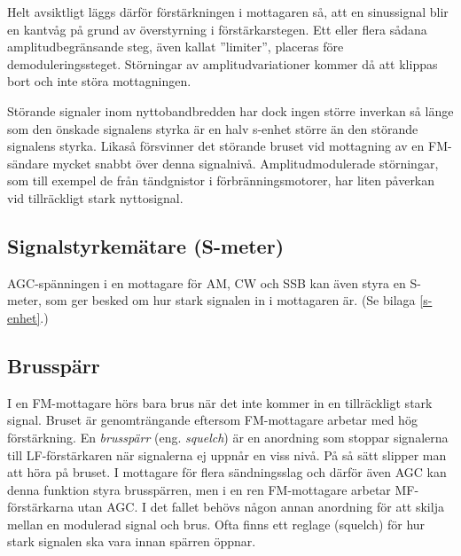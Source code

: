 
Helt avsiktligt läggs därför förstärkningen i mottagaren så, att en
sinussignal blir en kantvåg på grund av överstyrning i förstärkarstegen.
Ett eller flera sådana amplitudbegränsande steg, även kallat ''limiter'',
placeras före demoduleringssteget.
Störningar av amplitudvariationer kommer då att klippas bort och inte störa
mottagningen.

Störande signaler inom nyttobandbredden har dock ingen större inverkan
så länge som den önskade signalens styrka är en halv s-enhet större än
den störande signalens styrka.
Likaså försvinner det störande bruset vid mottagning av en FM-sändare mycket
snabbt över denna signalnivå.
Amplitudmodulerade störningar, som till exempel de från tändgnistor i
förbränningsmotorer, har liten påverkan vid tillräckligt stark nyttosignal.

\subsection{Signalstyrkemätare (S-meter)}

AGC-spänningen i en mottagare för AM, CW och SSB kan även styra en
S-meter, som ger besked om hur stark signalen in i mottagaren är.
(Se bilaga \ref{s-enhet}.)

\subsection{Brusspärr}

I en FM-mottagare hörs bara brus när det inte kommer in en tillräckligt stark
signal.
Bruset är genomträngande eftersom FM-mottagare arbetar med hög förstärkning.
En \emph{brusspärr} (eng. \emph{squelch}) är en anordning som stoppar
signalerna till LF-förstärkaren när signalerna ej uppnår en viss nivå.
På så sätt slipper man att höra på bruset.
I mottagare för flera sändningsslag och därför även AGC kan denna funktion
styra brusspärren, men i en ren FM-mottagare arbetar MF-förstärkarna utan AGC.
I det fallet behövs någon annan anordning för att skilja mellan en modulerad
signal och brus.
Ofta finns ett reglage (squelch) för hur stark signalen ska vara innan spärren
öppnar.


